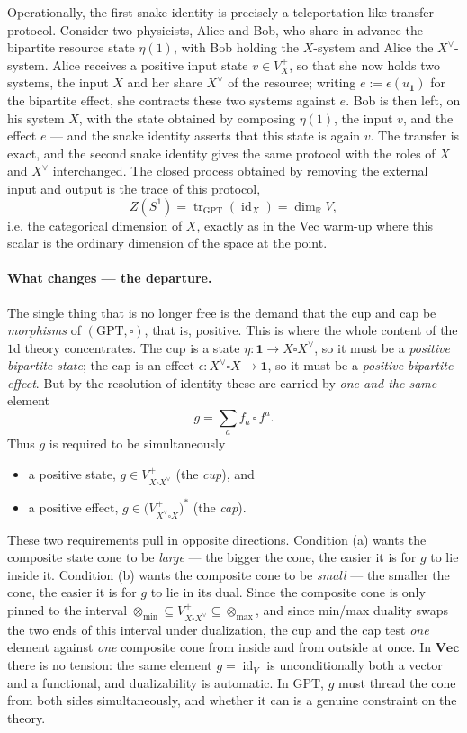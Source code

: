 \documentclass[prl,aps,10pt,superscriptaddress, floatfix]{revtex4-2}
\begin{document}
Operationally, the first snake identity is precisely a teleportation-like transfer protocol. Consider two physicists, Alice and Bob, who share in advance the bipartite resource state $\eta(1)$, with Bob holding the $X$-system and Alice the $X^\vee$-system. Alice receives a positive input state $v\in V_X^+$, so that she now holds two systems, the input $X$ and her share $X^\vee$ of the resource; writing $e:=\epsilon(u_{\mathbf 1})$ for the bipartite effect, she contracts these two systems against $e$. Bob is then left, on his system $X$, with the state obtained by composing $\eta(1)$, the input $v$, and the effect $e$ --- and the snake identity asserts that this state is again $v$. The transfer is exact, and the second snake identity gives the same protocol with the roles of $X$ and $X^\vee$ interchanged. The closed process obtained by removing the external input and output is the trace of this protocol,
\[
Z(S^1)=\operatorname{tr}_{\mathrm{GPT}}(\operatorname{id}_X)=\dim_{\mathbb R}V,
\]
i.e. the categorical dimension of $X$, exactly as in the Vec warm-up where this scalar is the ordinary dimension of the space at the point.

\paragraph*{What changes --- the departure.}
The single thing that is no longer free is the demand that the cup and cap be \emph{morphisms} of $(\mathrm{GPT},\square)$, that is, positive. This is where the whole content of the $1$d theory concentrates. The cup is a state $\eta:\mathbf 1\to X\square X^\vee$, so it must be a \emph{positive bipartite state}; the cap is an effect $\epsilon:X^\vee\square X\to\mathbf 1$, so it must be a \emph{positive bipartite effect}. But by the resolution of identity these are carried by \emph{one and the same} element
\[
g=\sum_a f_a\,\square\, f^a .
\]
Thus $g$ is required to be simultaneously
\begin{itemize}
\item[(a)] a positive state, $g\in V_{X\square X^\vee}^+$ \quad (the \emph{cup}), and
\item[(b)] a positive effect, $g\in\bigl(V_{X^\vee\square X}^+\bigr)^*$ \quad (the \emph{cap}).
\end{itemize}
These two requirements pull in opposite directions. Condition (a) wants the composite state cone to be \emph{large} --- the bigger the cone, the easier it is for $g$ to lie inside it. Condition (b) wants the composite cone to be \emph{small} --- the smaller the cone, the easier it is for $g$ to lie in its dual. Since the composite cone is only pinned to the interval $\otimes_{\min}\subseteq V_{X\square X^\vee}^+\subseteq\otimes_{\max}$, and since min/max duality swaps the two ends of this interval under dualization, the cup and the cap test \emph{one} element against \emph{one} composite cone from inside and from outside at once. In $\mathbf{Vec}$ there is no tension: the same element $g=\operatorname{id}_V$ is unconditionally both a vector and a functional, and dualizability is automatic. In GPT, $g$ must thread the cone from both sides simultaneously, and whether it can is a genuine constraint on the theory.
\end{document}
